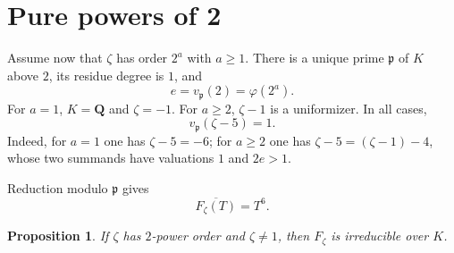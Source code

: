 \documentclass[11pt]{article}
\newtheorem{proposition}[theorem]{Proposition}
\newcommand{\Q}{\mathbf Q}
\begin{document}
\section{Pure powers of 2}

Assume now that $\zeta$ has order $2^a$ with $a\geq1$.  There is a
unique prime $\mathfrak p$ of $K$ above $2$, its residue degree is $1$,
and
\[
 e=v_{\mathfrak p}(2)=\varphi(2^a).
\]
For $a=1$, $K=\Q$ and $\zeta=-1$.  For $a\geq2$, $\zeta-1$ is a
uniformizer.  In all cases,
\begin{equation}\label{eq:zeta-5-one}
 v_{\mathfrak p}(\zeta-5)=1.
\end{equation}
Indeed, for $a=1$ one has $\zeta-5=-6$; for $a\geq2$ one has
$\zeta-5=(\zeta-1)-4$, whose two summands have valuations $1$ and
$2e>1$.

Reduction modulo $\mathfrak p$ gives
\begin{equation}\label{eq:pure-reduction}
 \overline{F_\zeta(T)}=T^6.
\end{equation}

\begin{proposition}\label{prop:pure-two}
If $\zeta$ has $2$-power order and $\zeta\neq1$, then $F_\zeta$ is
irreducible over $K$.
\end{proposition}
\end{document}
